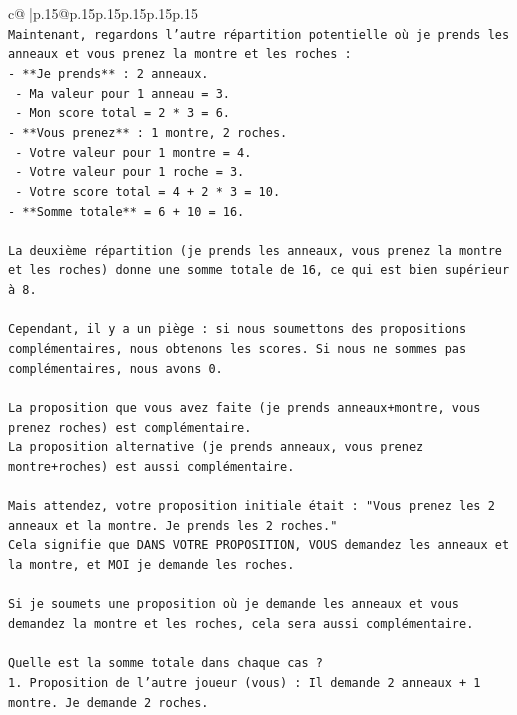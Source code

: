 \documentclass{article}
\begin{document}
{\begin{supertabular}{c@{$\;$}|p{.15\linewidth}@{}p{.15\linewidth}p{.15\linewidth}p{.15\linewidth}p{.15\linewidth}p{.15\linewidth}}
{{{\\ 
\texttt{Maintenant, regardons l'autre répartition potentielle où je prends les anneaux et vous prenez la montre et les roches :} \\
\texttt{{-} **Je prends** : 2 anneaux.} \\
\texttt{  {-} Ma valeur pour 1 anneau = 3.} \\
\texttt{  {-} Mon score total = 2 * 3 = 6.} \\
\texttt{{-} **Vous prenez** : 1 montre, 2 roches.} \\
\texttt{  {-} Votre valeur pour 1 montre = 4.} \\
\texttt{  {-} Votre valeur pour 1 roche = 3.} \\
\texttt{  {-} Votre score total = 4 + 2 * 3 = 10.} \\
\texttt{{-} **Somme totale** = 6 + 10 = 16.} \\
\\ 
\texttt{La deuxième répartition (je prends les anneaux, vous prenez la montre et les roches) donne une somme totale de 16, ce qui est bien supérieur à 8.} \\
\\ 
\texttt{Cependant, il y a un piège : si nous soumettons des propositions complémentaires, nous obtenons les scores. Si nous ne sommes pas complémentaires, nous avons 0.} \\
\\ 
\texttt{La proposition que vous avez faite (je prends anneaux+montre, vous prenez roches) est complémentaire.} \\
\texttt{La proposition alternative (je prends anneaux, vous prenez montre+roches) est aussi complémentaire.} \\
\\ 
\texttt{Mais attendez, votre proposition initiale était : "Vous prenez les 2 anneaux et la montre. Je prends les 2 roches."} \\
\texttt{Cela signifie que DANS VOTRE PROPOSITION, VOUS demandez les anneaux et la montre, et MOI je demande les roches.} \\
\\ 
\texttt{Si je soumets une proposition où je demande les anneaux et vous demandez la montre et les roches, cela sera aussi complémentaire.} \\
\\ 
\texttt{Quelle est la somme totale dans chaque cas ?} \\
\texttt{1. Proposition de l'autre joueur (vous) : Il demande 2 anneaux + 1 montre. Je demande 2 roches.} \\
}}}
\end{supertabular}}
\end{document}
